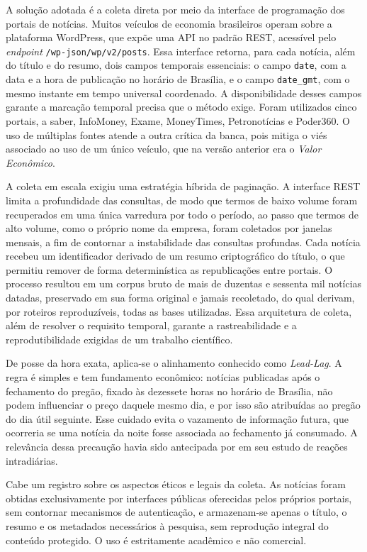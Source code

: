 A solução adotada é a coleta direta por meio da interface de programação dos portais de notícias. Muitos veículos de economia brasileiros operam sobre a plataforma WordPress, que expõe uma API no padrão REST, acessível pelo \textit{endpoint} \texttt{/wp-json/wp/v2/posts}. Essa interface retorna, para cada notícia, além do título e do resumo, dois campos temporais essenciais: o campo \texttt{date}, com a data e a hora de publicação no horário de Brasília, e o campo \texttt{date\_gmt}, com o mesmo instante em tempo universal coordenado. A disponibilidade desses campos garante a marcação temporal precisa que o método exige. Foram utilizados cinco portais, a saber, InfoMoney, Exame, MoneyTimes, Petronotícias e Poder360. O uso de múltiplas fontes atende a outra crítica da banca, pois mitiga o viés associado ao uso de um único veículo, que na versão anterior era o \textit{Valor Econômico}.

A coleta em escala exigiu uma estratégia híbrida de paginação. A interface REST limita a profundidade das consultas, de modo que termos de baixo volume foram recuperados em uma única varredura por todo o período, ao passo que termos de alto volume, como o próprio nome da empresa, foram coletados por janelas mensais, a fim de contornar a instabilidade das consultas profundas. Cada notícia recebeu um identificador derivado de um resumo criptográfico do título, o que permitiu remover de forma determinística as republicações entre portais. O processo resultou em um corpus bruto de mais de duzentas e sessenta mil notícias datadas, preservado em sua forma original e jamais recoletado, do qual derivam, por roteiros reproduzíveis, todas as bases utilizadas. Essa arquitetura de coleta, além de resolver o requisito temporal, garante a rastreabilidade e a reprodutibilidade exigidas de um trabalho científico.

De posse da hora exata, aplica-se o alinhamento conhecido como \textit{Lead-Lag}. A regra é simples e tem fundamento econômico: notícias publicadas após o fechamento do pregão, fixado às dezessete horas no horário de Brasília, não podem influenciar o preço daquele mesmo dia, e por isso são atribuídas ao pregão do dia útil seguinte. Esse cuidado evita o vazamento de informação futura, que ocorreria se uma notícia da noite fosse associada ao fechamento já consumado. A relevância dessa precaução havia sido antecipada por  em seu estudo de reações intradiárias.

Cabe um registro sobre os aspectos éticos e legais da coleta. As notícias foram obtidas exclusivamente por interfaces públicas oferecidas pelos próprios portais, sem contornar mecanismos de autenticação, e armazenam-se apenas o título, o resumo e os metadados necessários à pesquisa, sem reprodução integral do conteúdo protegido. O uso é estritamente acadêmico e não comercial.

